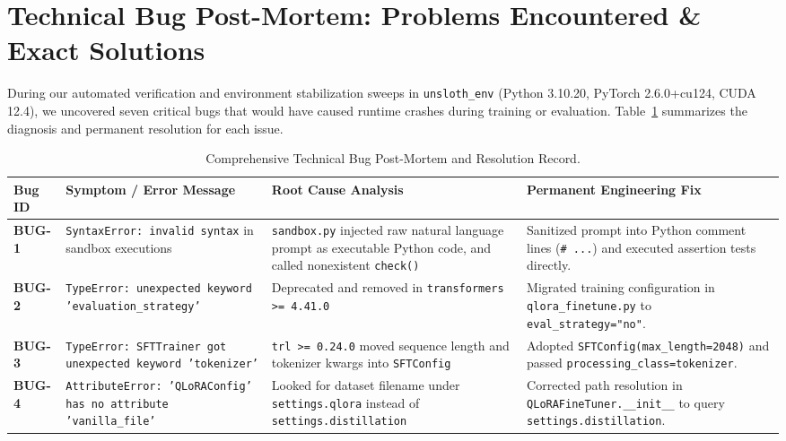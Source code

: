 \documentclass[12pt, a4paper]{article}
\begin{document}
\section{Technical Bug Post-Mortem: Problems Encountered \& Exact Solutions}

During our automated verification and environment stabilization sweeps in \texttt{unsloth\_env} (Python 3.10.20, PyTorch 2.6.0+cu124, CUDA 12.4), we uncovered seven critical bugs that would have caused runtime crashes during training or evaluation. Table~\ref{tab:bug_postmortem} summarizes the diagnosis and permanent resolution for each issue.

\begin{table}[H]
\centering
\scriptsize
\caption{Comprehensive Technical Bug Post-Mortem and Resolution Record.}
\label{tab:bug_postmortem}
\begin{tabularx}{\textwidth}{l p{3.8cm} p{4.2cm} X}
\toprule
\textbf{Bug ID} & \textbf{Symptom / Error Message} & \textbf{Root Cause Analysis} & \textbf{Permanent Engineering Fix} \\
\midrule
\textbf{BUG-1} & \texttt{SyntaxError: invalid syntax} in sandbox executions & \texttt{sandbox.py} injected raw natural language prompt as executable Python code, and called nonexistent \texttt{check()} & Sanitized prompt into Python comment lines (\texttt{\# ...}) and executed assertion tests directly. \\
\addlinespace[3pt]
\textbf{BUG-2} & \texttt{TypeError: unexpected keyword 'evaluation\_strategy'} & Deprecated and removed in \texttt{transformers >= 4.41.0} & Migrated training configuration in \texttt{qlora\_finetune.py} to \texttt{eval\_strategy="no"}. \\
\addlinespace[3pt]
\textbf{BUG-3} & \texttt{TypeError: SFTTrainer got unexpected keyword 'tokenizer'} & \texttt{trl >= 0.24.0} moved sequence length and tokenizer kwargs into \texttt{SFTConfig} & Adopted \texttt{SFTConfig(max\_length=2048)} and passed \texttt{processing\_class=tokenizer}. \\
\addlinespace[3pt]
\textbf{BUG-4} & \texttt{AttributeError: 'QLoRAConfig' has no attribute 'vanilla\_file'} & Looked for dataset filename under \texttt{settings.qlora} instead of \texttt{settings.distillation} & Corrected path resolution in \texttt{QLoRAFineTuner.\_\_init\_\_} to query \texttt{settings.distillation}. \\

\end{tabularx}
\end{table}
\end{document}
